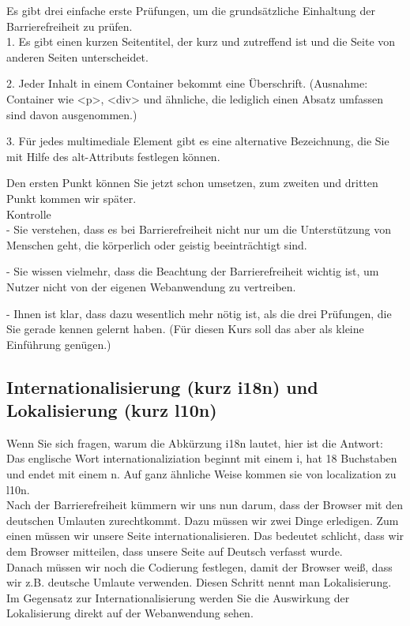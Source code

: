 Es gibt drei einfache erste Prüfungen, um die grundsätzliche Einhaltung der Barrierefreiheit zu prüfen. \\

1.	Es gibt einen kurzen Seitentitel, der kurz und zutreffend ist und die Seite von anderen Seiten unterscheidet.

2.	Jeder Inhalt in einem Container bekommt eine Überschrift. (Ausnahme: Container wie <p>, <div> und ähnliche, die lediglich einen Absatz umfassen sind davon ausgenommen.)

3.	Für jedes multimediale Element gibt es eine alternative Bezeichnung, die Sie mit Hilfe des alt-Attributs festlegen können. 

Den ersten Punkt können Sie jetzt schon umsetzen, zum zweiten und dritten Punkt kommen wir später.\\

Kontrolle\\

-	Sie verstehen, dass es bei Barrierefreiheit nicht nur um die Unterstützung von Menschen geht, die körperlich oder geistig beeinträchtigt sind.

-	Sie wissen vielmehr, dass die Beachtung der Barrierefreiheit wichtig ist, um Nutzer nicht von der eigenen Webanwendung zu vertreiben.

-	Ihnen ist klar, dass dazu wesentlich mehr nötig ist, als die drei Prüfungen, die Sie gerade kennen gelernt haben. (Für diesen Kurs soll das aber als kleine Einführung genügen.)

\subsection{Internationalisierung (kurz i18n) und Lokalisierung (kurz l10n)}

Wenn Sie sich fragen, warum die Abkürzung i18n lautet, hier ist die Antwort: Das englische Wort internationaliziation beginnt mit einem i, hat 18 Buchstaben und endet mit einem n. Auf ganz ähnliche Weise kommen sie von localization zu l10n.\\

Nach der Barrierefreiheit kümmern wir uns nun darum, dass der Browser mit den deutschen Umlauten zurechtkommt. Dazu müssen wir zwei Dinge erledigen. Zum einen müssen wir unsere Seite internationalisieren. Das bedeutet schlicht, dass wir dem Browser mitteilen, dass unsere Seite auf Deutsch verfasst wurde.\\

Danach müssen wir noch die Codierung festlegen, damit der Browser weiß, dass wir z.B. deutsche Umlaute verwenden. Diesen Schritt nennt man Lokalisierung. Im Gegensatz zur Internationalisierung werden Sie die Auswirkung der Lokalisierung direkt auf der Webanwendung sehen.\\

